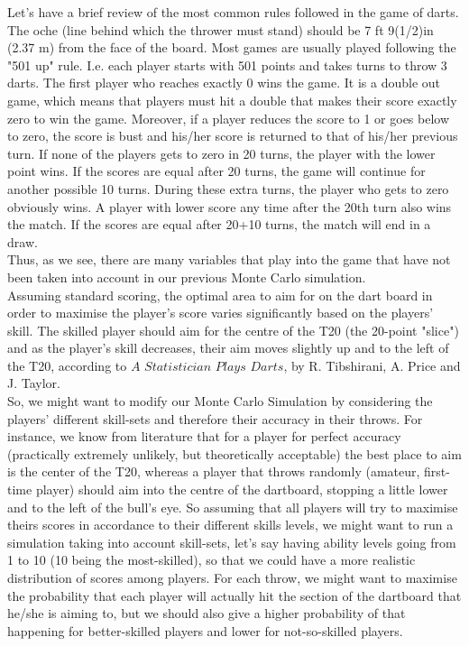 Let's have a brief review of the most common rules followed in the game of darts.\\
The oche (line behind which the thrower must stand) should be 7 ft 9(1/2)in (2.37 m) from the face of the board.
Most games are usually played following the "501 up" rule. I.e. each player starts with 501 points and takes turns to throw 3 darts. The first player who reaches exactly 0 wins the game. It is a double out game, which means that players must hit a double that makes their score exactly zero to win the game. Moreover, if a player reduces the score to 1 or goes below to zero, the score is bust and his/her score is returned to that of his/her previous turn. If none of the players gets to zero in 20 turns, the player with the lower point wins.
If the scores are equal after 20 turns, the game will continue for another possible 10 turns.
During these extra turns, the player who gets to zero obviously wins. A player with lower score any time after the 20th turn also wins the match.
If the scores are equal after 20+10 turns, the match will end in a draw.\\
Thus, as we see, there are many variables that play into the game that have not been taken into account in our previous Monte Carlo simulation.\\
Assuming standard scoring, the optimal area to aim for on the dart board in order to maximise the player's score varies significantly based on the players' skill. The skilled player should aim for the centre of the T20 (the 20-point "slice") and as the player's skill decreases, their aim moves slightly up and to the left of the T20, according to $\textit{A Statistician Plays Darts}$, by R. Tibshirani, A. Price and J. Taylor.\\
So, we might want to modify our Monte Carlo Simulation by considering the players' different skill-sets and therefore their accuracy in their throws. For instance, we know from literature that for a player for perfect accuracy (practically extremely unlikely, but theoretically acceptable) the best place to aim is the center of the T20, whereas a player that throws randomly (amateur, first-time player) should aim into the centre of the dartboard, stopping a little lower and to the left of the bull's eye. So assuming that all players will try to maximise theirs scores in accordance to their different skills levels, we might want to run a simulation taking into account skill-sets, let's say having ability levels going from 1 to 10 (10 being the most-skilled), so that we could have a more realistic distribution of scores among players. For each throw, we might want to maximise the probability that each player will actually hit the section of the dartboard that he/she is aiming to, but we should also give a higher probability of that happening for better-skilled players and lower for not-so-skilled players.\\

